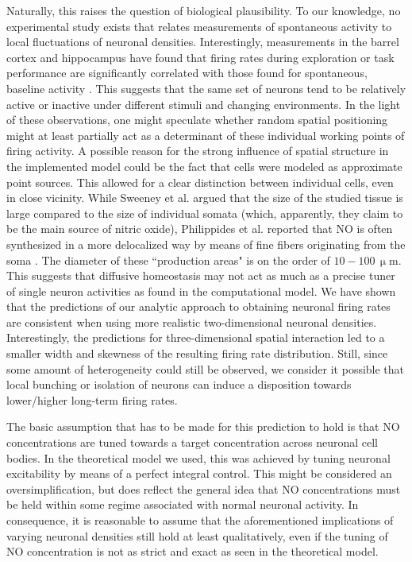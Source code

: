 \documentclass[10pt,letterpaper]{article}
\begin{document}
Naturally, this raises the question of biological plausibility. To our knowledge, no experimental study exists that relates measurements of spontaneous activity to local fluctuations of neuronal densities. Interestingly, measurements in the barrel cortex and hippocampus have found that firing rates during exploration or task performance are significantly correlated with those found for spontaneous, baseline activity \cite{OConnor_2010,Mizuseki_2013}. This suggests that the same set of neurons tend to be relatively active or inactive under different stimuli and changing environments. In the light of these observations, one might speculate whether random spatial positioning might at least partially act as a determinant of these individual working points of firing activity. A possible reason for the strong influence of spatial structure in the implemented model could be the fact that cells were modeled as approximate point sources. This allowed for a clear distinction between individual cells, even in close vicinity. While Sweeney et al. argued that the size of the studied tissue is large compared to the size of individual somata (which, apparently, they claim to be the main source of nitric oxide), Philippides et al. reported that NO is often synthesized in a more delocalized way by means of fine fibers originating from the soma \cite{Philippides_2005}. The diameter of these ``production areas" is on the order of $\mathrm{10-100\, \upmu m}$. This suggests that diffusive homeostasis may not act as much as a precise tuner of single neuron activities as found in the computational model. We have shown that the predictions of our analytic approach to obtaining neuronal firing rates are consistent when using more realistic two-dimensional neuronal densities. Interestingly, the predictions for three-dimensional spatial interaction led to a smaller width and skewness of the resulting firing rate distribution. Still, since some amount of heterogeneity could still be observed, we consider it possible that local bunching or isolation of neurons can induce a disposition towards lower/higher long-term firing rates.

The basic assumption that has to be made for this prediction to hold is that NO concentrations are tuned towards a target concentration across neuronal cell bodies. In the theoretical model we used, this was achieved by tuning neuronal excitability by means of a perfect integral control. This might be considered an oversimplification, but does reflect the general idea that NO concentrations must be held within some regime associated with normal neuronal activity. In consequence, it is reasonable to assume that the aforementioned implications of varying neuronal densities still hold at least qualitatively, even if the tuning of NO concentration is not as strict and exact as seen in the theoretical model.
\end{document}
